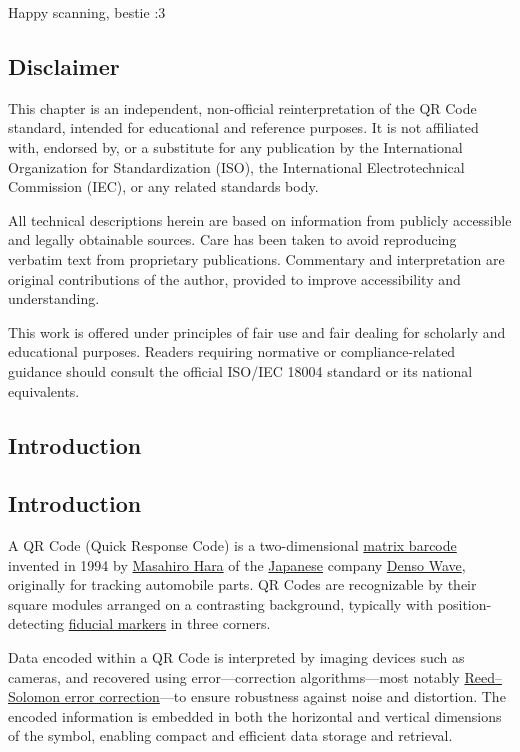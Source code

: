 Happy scanning, bestie :3

\subsection{Disclaimer}

This chapter is an independent, non-official reinterpretation of the QR Code standard, intended for educational and reference purposes. 
It is not affiliated with, endorsed by, or a substitute for any publication by the International Organization for Standardization (ISO), the International Electrotechnical Commission (IEC), or any related standards body.  

All technical descriptions herein are based on information from publicly accessible and legally obtainable sources.  Care has been taken to avoid reproducing verbatim text from proprietary publications.  Commentary and interpretation are original contributions of the author, provided to improve accessibility and understanding.  

This work is offered under principles of fair use and fair dealing for scholarly and educational purposes. Readers requiring normative or compliance-related guidance should consult the official ISO/IEC 18004 standard or its national equivalents.


\subsection{Introduction}

\subsection{Introduction}

A QR Code (Quick Response Code) is a two-dimensional \href{https://en.wikipedia.org/wiki/Barcode\#Matrix_(2D)_codes}{matrix
barcode} invented in 1994 by \href{https://en.wikipedia.org/wiki/Masahiro_Hara}{Masahiro Hara} of the \href{https://en.wikipedia.org/wiki/Japan}{Japanese} company \href{https://en.wikipedia.org/wiki/Denso\#DENSO_Wave}{Denso Wave}, originally for tracking automobile parts. 
QR Codes are recognizable by their square modules arranged on a contrasting background, typically with position-detecting \href{https://en.wikipedia.org/wiki/Fiducial_markers}{fiducial markers} in three corners.  

Data encoded within a QR Code is interpreted by imaging devices such as cameras, and recovered using error---correction algorithms—most notably \href{https://en.wikipedia.org/wiki/Reed\%E2\%80\%93Solomon_error_correction}{Reed--Solomon error correction}---to ensure robustness against noise and distortion. The encoded information is embedded in both the horizontal and vertical dimensions of the symbol, enabling compact and efficient data storage and retrieval.\cite{wikipedia-qr}

